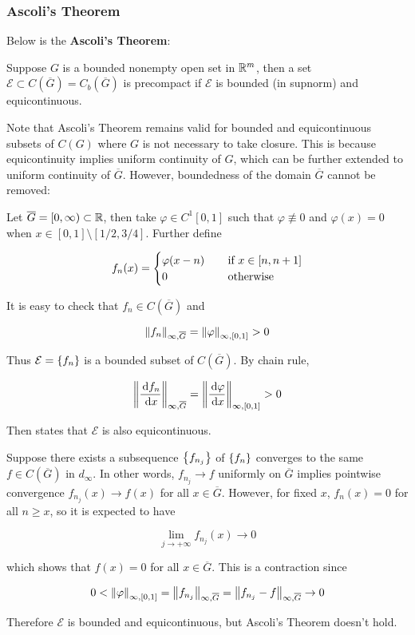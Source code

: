\documentclass[a4paper,12pt]{article}
\begin{document}
\subsubsection{Ascoli's Theorem}
Below is the \textbf{Ascoli's Theorem}:\n

\begin{thm}
  Suppose $G$ is a bounded nonempty open set in $\mathbb{R}^{m}$, then a set $\mathcal{E}\subset C(\overline{G})=C_{b}(\overline{G})$ is precompact if $\mathcal{E}$ is bounded (in supnorm) and equicontinuous.
\end{thm}\n

Note that Ascoli's Theorem remains valid for bounded and equicontinuous subsets of $C(G)$ where $G$ is not necessary to take closure. This is because equicontinuity implies uniform continuity of $G$, which can be further extended to uniform continuity of $\overline{G}$. However, boundedness of the domain $\overline{G}$ cannot be removed:\n

\begin{exm}
  Let $\overline{G}=[0,\infty)\subset\mathbb{R}$, then take $\varphi\in C^{1}[0,1]$ such that $\varphi\not\equiv 0$ and $\varphi(x)=0$ when $x\in[0,1]\setminus[1/2,3/4]$. Further define

  $$f_{n}(x)=\begin{cases}
    \varphi(x-n)&\;\;\;\;\text{if }x\in[n,n+1]\\
    0&\;\;\;\;\text{otherwise}
  \end{cases}$$\s

  It is easy to check that $f_{n}\in C(\overline{G})$ and

  $$\left\| f_{n}\right\|_{\infty,\overline{G}}=\left\| \varphi\right\|_{\infty,[0,1]}>0$$\s

  Thus $\mathcal{E}=\left\{ f_{n}\right\}$ is a bounded subset of $C(\overline{G})$. By chain rule,

  $$\left\| \frac{\,\mathrm{d} f_{n}}{\,\mathrm{d} x}\right\|_{\infty,\overline{G}}=\left\| \frac{\,\mathrm{d}\varphi}{\,\mathrm{d} x}\right\|_{\infty,[0,1]}>0$$\s

  Then \rpst[\sctd{3}] states that $\mathcal{E}$ is also equicontinuous.\n
  
  Suppose there exists a subsequence $\left\{ f_{n_{j}}\right\}$ of $\left\{ f_{n}\right\}$ converges to the same $f\in C(\overline{G})$ in $d_{\infty}$. In other words, $f_{n_{j}}\to f$ uniformly on $\overline{G}$ implies pointwise convergence $f_{n_{j}}(x)\to f(x)$ for all $x\in\overline{G}$. However, for fixed $x$, $f_{n}(x)=0$ for all $n\geq x$, so it is expected to have

  $$\lim_{j\to+\infty}f_{n_{j}}(x)\to 0$$\s

  which shows that $f(x)=0$ for all $x\in\overline{G}$. This is a contraction since

  $$0<\left\| \varphi\right\|_{\infty,[0,1]}=\left\| f_{n_{j}}\right\|_{\infty,\overline{G}}=\left\| f_{n_{j}}-f\right\|_{\infty,\overline{G}}\to 0$$\s

  Therefore $\mathcal{E}$ is bounded and equicontinuous, but Ascoli's Theorem doesn't hold.
\end{exm}
\end{document}
